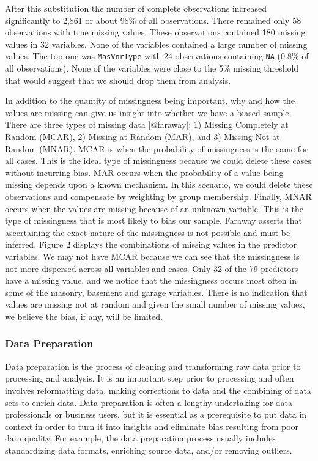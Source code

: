 \documentclass[
]{article}
\begin{document}
After this substitution the number of complete observations increased
significantly to 2,861 or about 98\% of all observations. There remained
only 58 observations with true missing values. These observations
contained 180 missing values in 32 variables. None of the variables
contained a large number of missing values. The top one was
\texttt{MasVnrType} with 24 observations containing \texttt{NA} (0.8\%
of all observations). None of the variables were close to the 5\%
missing threshold that would suggest that we should drop them from
analysis.

In addition to the quantity of missingness being important, why and how
the values are missing can give us insight into whether we have a biased
sample. There are three types of missing data {[}@faraway{]}: 1) Missing
Completely at Random (MCAR), 2) Missing at Random (MAR), and 3) Missing
Not at Random (MNAR). MCAR is when the probability of missingness is the
same for all cases. This is the ideal type of missingness because we
could delete these cases without incurring bias. MAR occurs when the
probability of a value being missing depends upon a known mechanism. In
this scenario, we could delete these observations and compensate by
weighting by group membership. Finally, MNAR occurs when the values are
missing because of an unknown variable. This is the type of missingness
that is most likely to bias our sample. Faraway asserts that
ascertaining the exact nature of the missingness is not possible and
must be inferred. Figure 2 displays the combinations of missing values
in the predictor variables. We may not have MCAR because we can see that
the missingness is not more dispersed across all variables and cases.
Only 32 of the 79 predictors have a missing value, and we notice that
the missingness occurs most often in some of the masonry, basement and
garage variables. There is no indication that values are missing not at
random and given the small number of missing values, we believe the
bias, if any, will be limited.

\hypertarget{data-preparation}{%
\subsubsection{Data Preparation}\label{data-preparation}}

Data preparation is the process of cleaning and transforming raw data
prior to processing and analysis. It is an important step prior to
processing and often involves reformatting data, making corrections to
data and the combining of data sets to enrich data. Data preparation is
often a lengthy undertaking for data professionals or business users,
but it is essential as a prerequisite to put data in context in order to
turn it into insights and eliminate bias resulting from poor data
quality. For example, the data preparation process usually includes
standardizing data formats, enriching source data, and/or removing
outliers.
\end{document}
